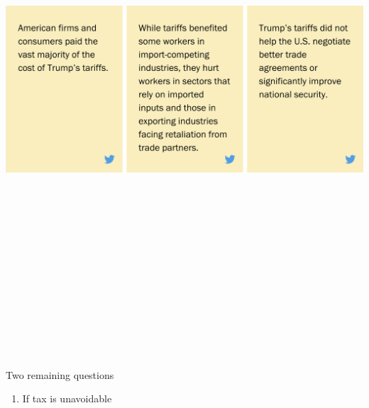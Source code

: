 \documentclass[
  ignorenonframetext,
]{beamer}
\providecommand{\tightlist}{%
  \setlength{\itemsep}{0pt}\setlength{\parskip}{0pt}}
\begin{document}
\begin{frame}{}
\protect\hypertarget{section-17}{}
\includegraphics[width=\textwidth,height=7.8125in]{figures/brookings_tariff.png}
\end{frame}

\begin{frame}{Two remaining questions}
\protect\hypertarget{two-remaining-questions}{}
\begin{enumerate}
\tightlist
\item
  If tax is unavoidable
\end{enumerate}
\end{frame}
\end{document}
